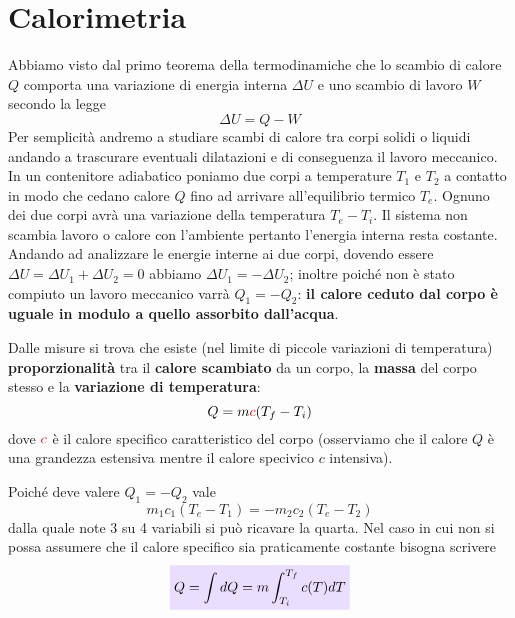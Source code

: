 \documentclass[x11names]{report}
\newcommand{\viola}[1]{\colorbox{yred}{$\displaystyle #1$}}
\begin{document}
\section{Calorimetria}
Abbiamo visto dal primo teorema della termodinamiche che lo scambio di calore \(Q\) comporta una variazione di energia interna \(\Delta U\) e uno scambio di lavoro \(W\) secondo la legge
\[ 
\Delta U = Q -W
\]
Per semplicità andremo a studiare scambi di calore tra corpi solidi o liquidi andando a trascurare eventuali dilatazioni e di conseguenza il lavoro meccanico. \\

\noindent
In un contenitore adiabatico poniamo due corpi a temperature \(T_1\) e \(T_2\) a contatto  in modo che cedano calore \(Q\) fino ad arrivare all'equilibrio termico \(T_e\). Ognuno dei due corpi avrà una variazione della temperatura \(T_{e} - T_i\). 
Il sistema non scambia lavoro o calore con l'ambiente pertanto l'energia interna resta costante. Andando ad analizzare le energie interne ai due corpi, dovendo essere \(\Delta U = \Delta U_1 + \Delta U_2 = 0\) abbiamo \(\Delta U_1 = -\Delta U_2\); inoltre poiché non è stato compiuto un lavoro meccanico varrà \(Q_1 = -Q_2\): \textbf{il calore ceduto dal corpo è uguale in modulo a quello assorbito dall'acqua}.


Dalle misure si trova che esiste (nel limite di piccole variazioni di temperatura) \textbf{proporzionalità} tra il \textbf{calore scambiato} da un corpo, la \textbf{massa} del corpo stesso e la \textbf{variazione di temperatura}:
\[ 
Q = m \textcolor{red}{c}(T_f - T_i)
\]
dove \(\textcolor{red}{c}\) è il calore specifico caratteristico del corpo (osserviamo che il calore \(Q\) è una grandezza estensiva mentre il calore specivico \(c\) intensiva).

Poiché deve valere \(Q_1 = -Q_2\) vale
\[ 
m_1 c_1(T_e - T_1) = -m_2 c_2(T_e - T_2)
\]
dalla quale note 3 su 4 variabili si può ricavare la quarta. Nel caso in cui non si possa assumere che il calore specifico sia praticamente costante bisogna scrivere
\begin{equation}
	\viola{Q = \int dQ = m \int_{T_i}^{T_{f}}c(T)dT}
\end{equation}
\end{document}
